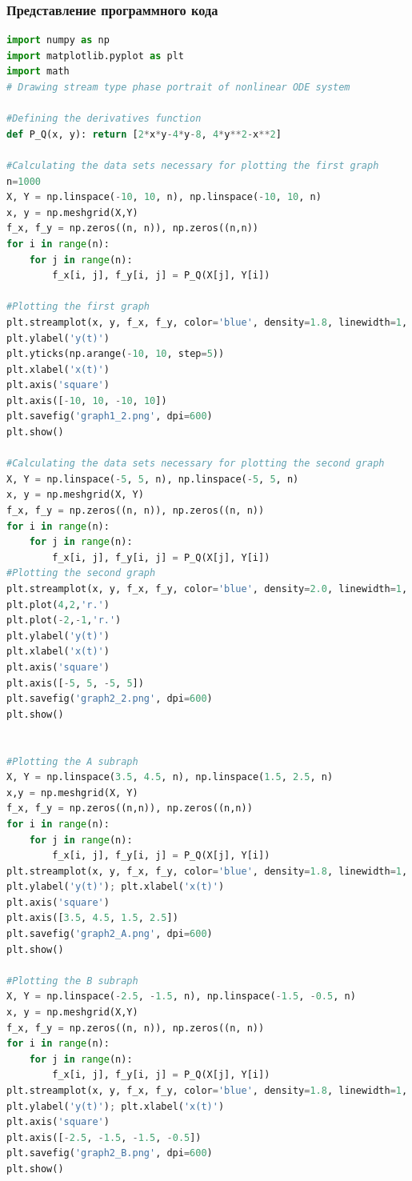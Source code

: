\documentclass{article}
\begin{document}
\newpage

\subsubsection{Представление программного кода}
\vspace{0.3cm}
\begin{lstlisting}[language=Python]
import numpy as np
import matplotlib.pyplot as plt
import math
# Drawing stream type phase portrait of nonlinear ODE system

#Defining the derivatives function
def P_Q(x, y): return [2*x*y-4*y-8, 4*y**2-x**2]

#Calculating the data sets necessary for plotting the first graph
n=1000
X, Y = np.linspace(-10, 10, n), np.linspace(-10, 10, n)
x, y = np.meshgrid(X,Y)
f_x, f_y = np.zeros((n, n)), np.zeros((n,n))
for i in range(n):
    for j in range(n):
        f_x[i, j], f_y[i, j] = P_Q(X[j], Y[i])
        
#Plotting the first graph
plt.streamplot(x, y, f_x, f_y, color='blue', density=1.8, linewidth=1, arrowsize=0.7)
plt.ylabel('y(t)')
plt.yticks(np.arange(-10, 10, step=5))
plt.xlabel('x(t)')
plt.axis('square')
plt.axis([-10, 10, -10, 10])
plt.savefig('graph1_2.png', dpi=600)
plt.show()

#Calculating the data sets necessary for plotting the second graph
X, Y = np.linspace(-5, 5, n), np.linspace(-5, 5, n)
x, y = np.meshgrid(X, Y)
f_x, f_y = np.zeros((n, n)), np.zeros((n, n))
for i in range(n):
    for j in range(n):
        f_x[i, j], f_y[i, j] = P_Q(X[j], Y[i])  
#Plotting the second graph
plt.streamplot(x, y, f_x, f_y, color='blue', density=2.0, linewidth=1, arrowsize=0.7)
plt.plot(4,2,'r.')
plt.plot(-2,-1,'r.')
plt.ylabel('y(t)')
plt.xlabel('x(t)')
plt.axis('square')
plt.axis([-5, 5, -5, 5])
plt.savefig('graph2_2.png', dpi=600)
plt.show()


#Plotting the A subraph
X, Y = np.linspace(3.5, 4.5, n), np.linspace(1.5, 2.5, n)
x,y = np.meshgrid(X, Y)
f_x, f_y = np.zeros((n,n)), np.zeros((n,n))
for i in range(n):
    for j in range(n):
        f_x[i, j], f_y[i, j] = P_Q(X[j], Y[i])
plt.streamplot(x, y, f_x, f_y, color='blue', density=1.8, linewidth=1, arrowsize=0.7)
plt.ylabel('y(t)'); plt.xlabel('x(t)')
plt.axis('square')
plt.axis([3.5, 4.5, 1.5, 2.5])
plt.savefig('graph2_A.png', dpi=600)
plt.show()

#Plotting the B subraph
X, Y = np.linspace(-2.5, -1.5, n), np.linspace(-1.5, -0.5, n)
x, y = np.meshgrid(X,Y)
f_x, f_y = np.zeros((n, n)), np.zeros((n, n))
for i in range(n):
    for j in range(n):
        f_x[i, j], f_y[i, j] = P_Q(X[j], Y[i])
plt.streamplot(x, y, f_x, f_y, color='blue', density=1.8, linewidth=1, arrowsize=0.7)
plt.ylabel('y(t)'); plt.xlabel('x(t)')
plt.axis('square')
plt.axis([-2.5, -1.5, -1.5, -0.5])
plt.savefig('graph2_B.png', dpi=600)
plt.show()


\end{lstlisting}
\end{document}
